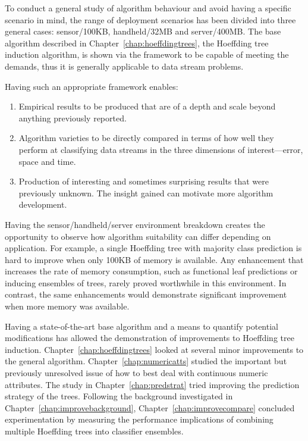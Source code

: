 To conduct a general study of algorithm behaviour and avoid having a specific scenario in mind, the range of deployment scenarios has been divided into three general cases: sensor/100KB, handheld/32MB and server/400MB. The base algorithm described in Chapter~\ref{chap:hoeffdingtrees}, the Hoeffding tree induction algorithm, is shown via the framework to be capable of meeting the demands, thus it is generally applicable to data stream problems.

Having such an appropriate framework enables:
\begin{enumerate}
\item Empirical results to be produced that are of a depth and scale beyond anything previously reported.
\item Algorithm varieties to be directly compared in terms of how well they perform at classifying data streams in the three dimensions of interest---error, space and time.
\item Production of interesting and sometimes surprising results that were previously unknown. The insight gained can motivate more algorithm development.
\end{enumerate}

Having the sensor/handheld/server environment breakdown creates the opportunity to observe how algorithm suitability can differ depending on application. For example, a single Hoeffding tree with majority class prediction is hard to improve when only 100KB of memory is available. Any enhancement that increases the rate of memory consumption, such as functional leaf predictions or inducing ensembles of trees, rarely proved worthwhile in this environment. In contrast, the same enhancements would demonstrate significant improvement when more memory was available.

Having a state-of-the-art base algorithm and a means to quantify potential modifications has allowed the demonstration of improvements to Hoeffding tree induction. Chapter~\ref{chap:hoeffdingtrees} looked at several minor improvements to the general algorithm.
Chapter~\ref{chap:numericatts} studied the important but previously unresolved issue of how to best deal with continuous numeric attributes.
The study in Chapter~\ref{chap:predstrat} tried improving the prediction strategy of the trees. 
Following the background investigated in Chapter~\ref{chap:improvebackground}, Chapter~\ref{chap:improvecompare} concluded experimentation by measuring the performance implications of combining multiple Hoeffding trees into classifier ensembles.

